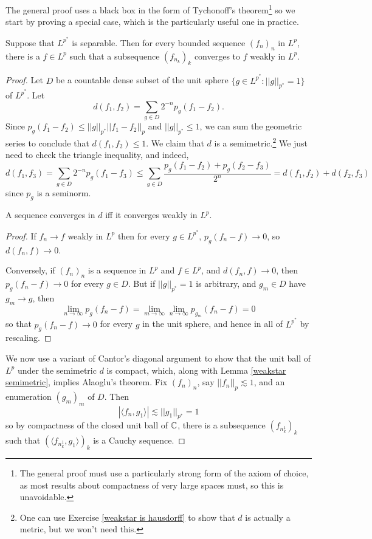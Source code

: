 The general proof uses a black box in the form of Tychonoff's theorem\footnote{The general proof must use a particularly strong form of the axiom of choice, as most results about compactness of very large spaces must, so this is unavoidable.} so we start by proving a special case, which is the particularly useful one in practice.

\begin{theorem}
Suppose that $L^{p^*}$ is separable. Then for every bounded sequence $(f_{n})_{n}$ in $L^p$, there is a $f \in L^p$ such that a subsequence $(f_{n_{k}})_{k}$ converges to $f$ weakly in $L^p$.
\end{theorem}
\begin{proof}
Let $D$ be a countable dense subset of the unit sphere $\{g \in L^{p^*}: ||g||_{p^*} = 1\}$ of $L^{p^*}$.
Let
\[d(f_1, f_2) = \sum_{g \in D} 2^{-n} p_g(f_1 - f_2).\]
Since $p_g(f_1 - f_2) \leq ||g||_{p^*} ||f_1 - f_2||_{p} $ and $||g||_{p^*} \leq 1$, we can sum the geometric series to conclude that $d(f_1, f_2) \leq 1$.
We claim that $d$ is a semimetric.\footnote{One can use Exercise \ref{weakstar is hausdorff} to show that $d$ is actually a metric, but we won't need this.}
We just need to check the triangle inequality, and indeed,
\[d(f_1, f_3) = \sum_{g \in D} 2^{-n} p_g(f_1 - f_3) \leq \sum_{g \in D} \frac{p_g(f_1 - f_2) + p_g(f_2 - f_3)}{2^n} = d(f_1, f_2) + d(f_2, f_3)\]
since $p_g$ is a seminorm.

\begin{lemma}
\label{weakstar semimetric}
A sequence converges in $d$ iff it converges weakly in $L^p$.
\end{lemma}
\begin{proof}
If $f_{n} \to f$ weakly in $L^p$ then for every $g \in L^{p^*}$, $p_g(f_{n} - f) \to 0$, so $d(f_{n}, f) \to 0$.

Conversely, if $(f_{n})_{n}$ is a sequence in $L^p$ and $f \in L^p$, and $d(f_{n}, f) \to 0$, then $p_g(f_{n} - f) \to 0$ for every $g \in D$.
But if $||g||_{p^*} = 1$ is arbitrary, and $g_{m} \in D$ have $g_{m} \to g$, then
\[\lim_{n \to \infty} p_g(f_{n} - f) = \lim_{m \to \infty} \lim_{n \to \infty} p_{g_{m}}(f_{n} - f) = 0\]
so that $p_g(f_{n} - f) \to 0$ for every $g$ in the unit sphere, and hence in all of $L^{p^*}$ by rescaling.
\end{proof}

We now use a variant of Cantor's diagonal argument to show that the unit ball of $L^p$ under the semimetric $d$ is compact, which, along with Lemma \ref{weakstar semimetric}, implies Alaoglu's theorem.
Fix $(f_{n})_{n}$, say $||f_{n}||_{p}  \lesssim 1$, and an enumeration $(g_{m})_{m}$ of $D$.
Then
\[|\langle f_{n}, g_1\rangle| \lesssim ||g_1||_{p^*} = 1\]
so by compactness of the closed unit ball of $\mathbb{C}$, there is a subsequence $(f_{n_{k}^1})_{k}$ such that $(\langle f_{n_{k}^1}, g_1\rangle)_{k}$ is a Cauchy sequence.


\end{proof}
